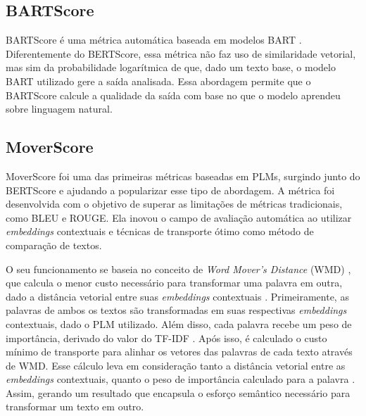 \documentclass[cic,tc]{iiufrgs}
\begin{document}
\subsection{BARTScore}
BARTScore \cite{yuan2021bartscore} é uma métrica automática baseada em modelos BART \cite{lewis2019bart}. Diferentemente do BERTScore, essa métrica não faz uso de similaridade vetorial, mas sim da probabilidade logarítmica de que, dado um texto base, o modelo BART utilizado gere a saída analisada. Essa abordagem permite que o BARTScore calcule a qualidade da saída com base no que o modelo aprendeu sobre linguagem natural.

\subsection{MoverScore}
MoverScore \cite{zhao2019moverscore} foi uma das primeiras métricas baseadas em PLMs, surgindo junto do BERTScore e ajudando a popularizar esse tipo de abordagem. A métrica foi desenvolvida com o objetivo de superar as limitações de métricas tradicionais, como BLEU e ROUGE. Ela inovou o campo de avaliação automática ao utilizar \textit{embeddings} contextuais e técnicas de transporte ótimo como método de comparação de textos.

O seu funcionamento se baseia no conceito de \textit{Word Mover's Distance} (WMD) \cite{kusner2015word}, que calcula o menor custo necessário para transformar uma palavra em outra, dado a distância vetorial entre suas \textit{embeddings} contextuais%
. Primeiramente, as palavras de ambos os textos são transformadas em suas respectivas \textit{embeddings} contextuais, dado o PLM utilizado. Além disso, cada palavra recebe um peso de importância, derivado do valor do TF-IDF \cite{sparck1972statistical}%
. Após isso, é calculado o custo mínimo de transporte para alinhar os vetores das palavras de cada texto através de WMD. Esse cálculo leva em consideração tanto a distância vetorial entre as \textit{embeddings} contextuais, quanto o peso de importância calculado para a palavra%
. Assim, gerando um resultado que encapsula o esforço semântico necessário para transformar um texto em outro.

\end{document}
